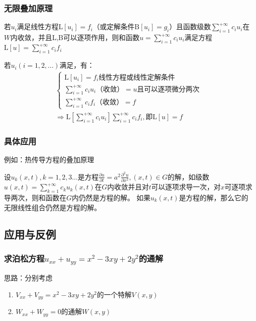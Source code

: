\subsubsection{无限叠加原理}

若\(u_i\)满足线性方程\(\mathrm{L}\left[u_i\right]=f_i\)（或定解条件\(\mathrm{B}[u_i]=g_i\)）且函数级数\(\sum\limits_{i=1}^{+\infty}c_iu_i\)在\(W\)内收敛，并且L,B可以逐项作用，则和函数\(u=\sum\limits_{i=1}^{+\infty}c_iu_i\)满足方程\(\mathrm{L}[u]=\sum\limits_{i=1}^{+\infty}c_if_i\)

若\(u_i(i=1,2,\ldots)\)满足，有：
\begin{gather*}\begin{cases}
\mathrm{L}[u_i]=f_i\text{线性方程或线性定解条件}\\
\sum\limits_{i=1}^{+\infty}c_iu_i\text{（收敛）}=u\text{且可以逐项微分两次}\\
\sum\limits_{i=1}^{+\infty}c_if_i\text{（收敛）}=f
\end{cases}\\
\Rightarrow\mathrm{L}\left[\sum_{i=1}^{+\infty}c_iu_i\right]\sum_{i=1}^{+\infty}c_if_i,\text{即}\mathrm{L}[u]=f
\end{gather*}

\subsubsection{具体应用}

例如：热传导方程的叠加原理

设\(u_k(x,t),k=1,2,3\ldots\)是方程\(\frac{\partial u}{\partial t}=a^2\frac{\partial^2u}{\partial x^2},(x,t)\in G\)的解，如级数\(u(x,t)=\sum\limits_{k=1}^{+\infty}c_ku_k(x,t)\)在\(G\)内收敛并且对\(t\)可以逐项求导一次，对\(x\)可逐项求导两次，则和函数在\(G\)内仍然是方程的解。	如果\(u_k(x,t)\)是方程的解，那么它的无限线性组合仍然是方程的解。

\subsection{应用与反例}
\subsubsection{求泊松方程\(u_{xx}+u_{yy}=x^2-3xy+2y^2\)的通解}

思路：分别考虑
\begin{enumerate}
	\item \(V_{xx}+V_{yy}=x^2-3xy+2y^2\)的一个特解\(V(x,y)\)\label{enu:1}
	\item \(W_{xx}+W_{yy}=0\)的通解\(W(x,y)\)
\end{enumerate}

